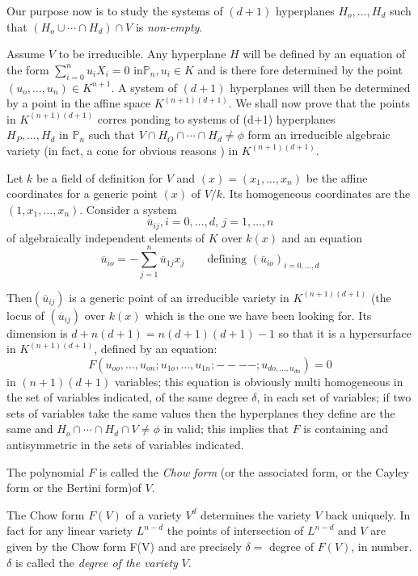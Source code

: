 {Our purpose now is to study the systems of $(d+1)$ hyperplanes
$H_o,\ldots, H_d$ such that $(H_o\cup \cdots \cap H_d) \cap V $ is \textit{
  non-empty}. 

Assume $V$ to be irreducible. Any hyperplane $H$ will be defined by an
equation of the form $\sum \limits^n_{i=0}u_i X_i=0 \text{ in
}\mathbb{P}_n, u_i \in K$ and is there fore determined by the point
$(u_o, \ldots ,u_n ) \in K^{n+1}$. A system of $(d+1)$ hyperplanes
will then be determined by a point in the affine space
$K^{(n+1)(d+1)}$. We shall now prove that the points in
$K^{(n+1)(d+1)}$ corres ponding to systems of (d+1) hyperplanes $H_P,
\ldots, H_d \text{ in } \mathbb{P}_n$ such that $V \cap H_O \cap
\cdots \cap H_d \neq \phi $ form an irreducible algebraic variety (in
fact, a cone for obvious reasons ) in $K^{(n+1)(d+1)}$. 

Let $k$ be a field of definition for $V$ and $(x)=(x_1, \ldots,x_n)$
be the affine coordinates for a generic point $(x)$ of $V/k$. Its
homogeneous coordinates are the $(1,x_1, \ldots,x_n)$. Consider a
system   
$$
\overline{u}_{ij},i=0,\ldots,d, \, j=1, \ldots, n
$$
of algebraically independent elements of $K$ over $k(x)$ and an equation
$$
\overline{u}_{io}=-\sum^n_{j=1} \overline{u}_{1j}x_j \qquad \text{
  defining } (\overline{u}_{io})_{i=0, \ldots,d} 
$$

Then\pageoriginale $(\overline{u}_{ij})$ is a generic point of an irreducible
variety in $K^{(n+1)(d+1)}$ (the locus of $(\overline{u}_{ij})$ over
$k(x)$ which is the one we have been looking for. Its dimension is
$d+ n(d+1)= n(d+1)(d+1)-1$ so that it is a hypersurface in $K^{(n+1)(d+1)}$,
defined by an equation:  
$$
F(u_{oo}, \ldots ,u_{on}; u_{1o}, \ldots , u_{1n} ; ---- ; u_{do,
  \ldots , u_{dn}})=0 
 $$ 
in $(n+1)(d+1)$ variables; this equation is obviously multi homogeneous
in the set of variables indicated, of the same degree $\delta$, in
each set of variables; if two sets of variables take the same values
then the hyperplanes they define are the same and $H_o \cap \cdots
\cap H_d \cap V \neq \phi$ in valid; this implies that $F$ is
containing and antisymmetric in the sets of variables indicated. 

The polynomial $F$ is called the \textit{Chow form} (or the associated
form, or the Cayley form or the Bertini form)of $V$. 

The Chow form $F(V)$ of a variety $V^d$ determines the variety $V$
back uniquely. In fact for any  linear variety $L^{n-d}$ the points of
intersection of $L^{n-d}$ and $V$ are given by the Chow form F(V) and
are precisely $\delta=$ degree of $F(V)$, in number.$\delta$ is called
the \textit{degree of the variety} $V$. 

}
